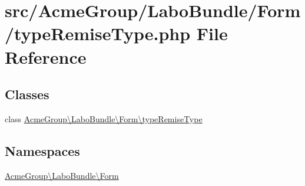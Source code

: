 \hypertarget{type_remise_type_8php}{\section{src/\+Acme\+Group/\+Labo\+Bundle/\+Form/type\+Remise\+Type.php File Reference}
\label{type_remise_type_8php}
}
\subsection*{Classes}
\begin{DoxyCompactItemize}
\item 
class \hyperlink{class_acme_group_1_1_labo_bundle_1_1_form_1_1type_remise_type}{Acme\+Group\textbackslash{}\+Labo\+Bundle\textbackslash{}\+Form\textbackslash{}type\+Remise\+Type}
\end{DoxyCompactItemize}
\subsection*{Namespaces}
\begin{DoxyCompactItemize}
\item 
 \hyperlink{namespace_acme_group_1_1_labo_bundle_1_1_form}{Acme\+Group\textbackslash{}\+Labo\+Bundle\textbackslash{}\+Form}
\end{DoxyCompactItemize}

